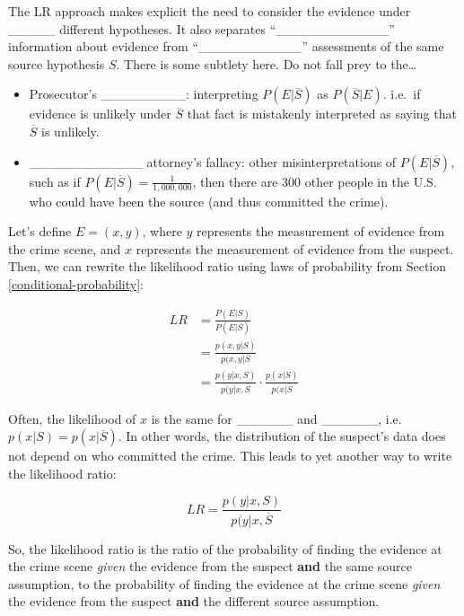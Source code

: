 \documentclass[]{book}
\providecommand{\tightlist}{%
  \setlength{\itemsep}{0pt}\setlength{\parskip}{0pt}}
\theoremstyle{definition}
\theoremstyle{definition}
\theoremstyle{remark}
\begin{document}
The LR approach makes explicit the need to consider the evidence under
\_\_\_\_\_ different hypotheses. It also separates
``\_\_\_\_\_\_\_\_\_\_\_\_'' information about evidence from
``\_\_\_\_\_\_\_\_\_\_\_'' assessments of the same source hypothesis
\(S\). There is some subtlety here. Do not fall prey to the\ldots{}

\begin{itemize}
\tightlist
\item
  Prosecutor's \_\_\_\_\_\_\_\_\_: interpreting \(P(E|\overline{S})\) as
  \(P(\overline{S}|E)\). i.e.~if evidence is unlikely under
  \(\overline{S}\) that fact is mistakenly interpreted as saying that
  \(\overline{S}\) is unlikely. \vspace{.1in}
\item
  \_\_\_\_\_\_\_\_\_\_\_\_ attorney's fallacy: other misinterpretations
  of \(P(E|\overline{S})\), such as if
  \(P(E|\overline{S}) = \frac{1}{1,000,000}\), then there are 300 other
  people in the U.S. who could have been the source (and thus committed
  the crime).
\end{itemize}

Let's define \(E=(x,y)\), where \(y\) represents the measurement of
evidence from the crime scene, and \(x\) represents the measurement of
evidence from the suspect. Then, we can rewrite the likelihood ratio
using laws of probability from Section \ref{conditional-probability}:

\begin{equation}\label{eq:lrredo}
\begin{split}
LR & = \frac{P(E|S)}{P(E|\overline{S})} \\
  & = \frac{p(x,y | S)}{p(x,y | \overline{S}} \\ 
  & = \frac{p(y | x, S)}{p(y | x, \overline{S}} \cdot \frac{p(x| S)}{p(x| \overline{S}} 
\end{split}
\end{equation}

Often, the likelihood of \(x\) is the same for \_\_\_\_\_\_ and
\_\_\_\_\_\_, i.e. \(p(x| S)= p(x| \overline{S})\). In other words, the
distribution of the suspect's data does not depend on who committed the
crime. This leads to yet another way to write the likelihood ratio:

\begin{equation}\label{eq:lr3}
LR = \frac{p(y | x, S)}{p(y | x, \overline{S}}
\end{equation}

So, the likelihood ratio is the ratio of the probability of finding the
evidence at the crime scene \emph{given} the evidence from the suspect
\textbf{and} the same source assumption, to the probability of finding
the evidence at the crime scene \emph{given} the evidence from the
suspect \textbf{and} the different source assumption.
\end{document}
